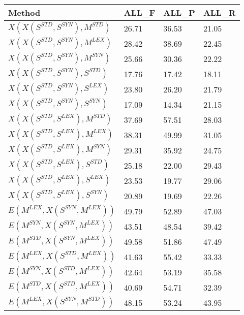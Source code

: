 \begin{table*}[]
\centering
\begin{tabular}{@{\makebox[1.25em][l]{\rownumber\space}}llll@{}}
\toprule
% 
\textbf{Method} & \textbf{ALL\_F} & \textbf{ALL\_P} & \textbf{ALL\_R} \\ \midrule


$X(X(S^{STD}, S^{SYN}), M^{STD})$  & 26.71           & 36.53           & 21.05\\ 
$X(X(S^{STD}, S^{SYN}), M^{LEX})$  & 28.42          & 38.69           & 22.45\\ 
$X(X(S^{STD}, S^{SYN}), M^{SYN})$  & 25.66           & 30.36           & 22.22 \\ 
\midrule

$X(X(S^{STD}, S^{SYN}), S^{STD})$  & 17.76           & 17.42           & 18.11\\ 
$X(X(S^{STD}, S^{SYN}), S^{LEX})$  & 23.80          & 26.20           & 21.79\\ 
$X(X(S^{STD}, S^{SYN}), S^{SYN})$  & 17.09           & 14.34           & 21.15 \\ 
\midrule
$X(X(S^{STD},S^{LEX}), M^{STD})$  & 37.69           & 57.51           & 28.03\\ 
$X(X(S^{STD}, S^{LEX}), M^{LEX})$  & 38.31          & 49.99           & 31.05\\ 
$X(X(S^{STD}, S^{LEX}), M^{SYN})$  & 29.31           & 35.92           & 24.75 \\ 
\midrule
%
$X(X(S^{STD}, S^{LEX}), S^{STD})$  & 25.18          & 22.00           & 29.43\\ 
$X(X(S^{STD}, S^{LEX}), S^{LEX})$  & 23.53         & 19.77           & 29.06\\ 
$X(X(S^{STD}, S^{LEX}), S^{SYN})$  & 20.89           & 19.69           & 22.26 \\ 
\midrule
$E(M^{LEX}, X(S^{SYN}, M^{LEX}))$      & 49.79	&	52.89	&	47.03           \\
$E(M^{SYN}, X(S^{SYN}, M^{LEX}))$      & 43.51	&	48.54	&	39.42          \\ 
$E(M^{STD}, X(S^{SYN}, M^{LEX}))$      & 49.58	&	51.86	&	47.49           \\
\midrule
$E(M^{LEX}, X(S^{STD}, M^{LEX}))$      & 41.63	&	55.42	&	33.33           \\
$E(M^{SYN}, X(S^{STD}, M^{LEX}))$      & 42.64	&	53.19	&	35.58           \\ 
$E(M^{STD}, X(S^{STD}, M^{LEX}))$      & 40.69	&	54.71	&	32.39			\\
\midrule
$E(M^{LEX}, X(S^{SYN}, M^{STD}))$      & 48.15	&	53.24	&	43.95           \\

\end{tabular}
\end{table*}
